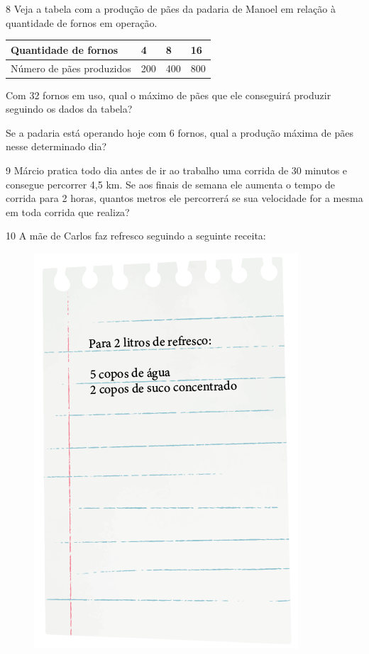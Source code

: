 \num{8} Veja a tabela com a produção de pães da padaria de Manoel em relação à quantidade de fornos em operação.

\begin{center}
\begin{tabular}{l|l|l|l}
\hline
Quantidade de fornos & 4 & 8 & 16 \\ \hline
Número de pães produzidos & 200 & 400 & 800 \\ \hline
\end{tabular}
\end{center}

\begin{escolha}
\item
  Com 32 fornos em uso, qual o máximo de pães que ele conseguirá
  produzir seguindo os dados da tabela?


\item
  Se a padaria está operando hoje com 6 fornos, qual a produção máxima
  de pães nesse determinado dia?

\end{escolha}

\num{9} Márcio pratica todo dia antes de ir ao trabalho uma corrida de 30
minutos e consegue percorrer 4,5 km. Se aos finais de semana ele aumenta o
tempo de corrida para 2 horas, quantos metros ele percorrerá se sua
velocidade for a mesma em toda corrida que realiza?


\pagebreak
\num{10} A mãe de Carlos faz refresco seguindo a seguinte receita:

\begin{figure}[htpb!]
\centering
\includegraphics[width=.5\textwidth]{../ilustracoes/MAT5/SAEB_5ANO_MAT_figura79.png}
\end{figure}

